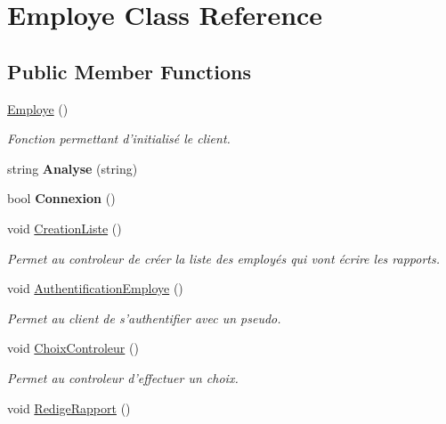 \hypertarget{class_employe}{\section{\-Employe \-Class \-Reference}
\label{class_employe}
}
\subsection*{\-Public \-Member \-Functions}
\begin{DoxyCompactItemize}
\item 
\hypertarget{class_employe_a8b38bbb4289f3f7b66c4d11b420fb27b}{\hyperlink{class_employe_a8b38bbb4289f3f7b66c4d11b420fb27b}{\-Employe} ()}\label{class_employe_a8b38bbb4289f3f7b66c4d11b420fb27b}

\begin{DoxyCompactList}\small\item\em \-Fonction permettant d'initialisé le client. \end{DoxyCompactList}\item 
\hypertarget{class_employe_aefaf8b63319291c5d557583f62c234a9}{string {\bfseries \-Analyse} (string)}\label{class_employe_aefaf8b63319291c5d557583f62c234a9}

\item 
\hypertarget{class_employe_a3e6e9f9a6562bd3a6c666f3a20b01182}{bool {\bfseries \-Connexion} ()}\label{class_employe_a3e6e9f9a6562bd3a6c666f3a20b01182}

\item 
\hypertarget{class_employe_adb7b87de03816ae56db8b3e56e5907d6}{void \hyperlink{class_employe_adb7b87de03816ae56db8b3e56e5907d6}{\-Creation\-Liste} ()}\label{class_employe_adb7b87de03816ae56db8b3e56e5907d6}

\begin{DoxyCompactList}\small\item\em \-Permet au controleur de créer la liste des employés qui vont écrire les rapports. \end{DoxyCompactList}\item 
\hypertarget{class_employe_aaef2ea495679ab80403b116e4618b4e8}{void \hyperlink{class_employe_aaef2ea495679ab80403b116e4618b4e8}{\-Authentification\-Employe} ()}\label{class_employe_aaef2ea495679ab80403b116e4618b4e8}

\begin{DoxyCompactList}\small\item\em \-Permet au client de s'authentifier avec un pseudo. \end{DoxyCompactList}\item 
void \hyperlink{class_employe_a8e2d2bc84c72f331a8d46b1eed82855f}{\-Choix\-Controleur} ()
\begin{DoxyCompactList}\small\item\em \-Permet au controleur d'effectuer un choix. \end{DoxyCompactList}\item 
\hypertarget{class_employe_a1334cc9524ed8018b3addb456e855d7c}{void \hyperlink{class_employe_a1334cc9524ed8018b3addb456e855d7c}{\-Redige\-Rapport} ()}\label{class_employe_a1334cc9524ed8018b3addb456e855d7c}


\end{DoxyCompactItemize}
